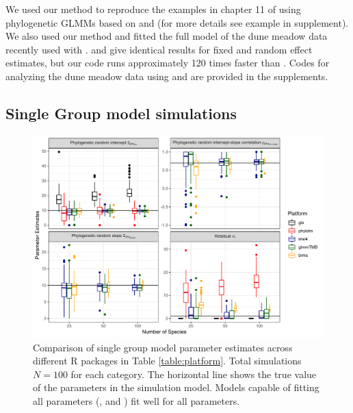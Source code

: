 \documentclass[12pt]{article}
\begin{document}
We used our method to reproduce the examples in chapter 11 of \cite{garamszegi2014modern} using phylogenetic GLMMs based on  and  (for more details see example in supplement).
We also used our method and fitted the full model of the dune meadow data recently used with  \citep{li2017canfun}. 
 and  give identical results for fixed and random effect estimates, but our code runs approximately 120 times faster than . 
Codes for analyzing the dune meadow data using  and  are provided in the supplements. 

\subsection*{Single Group model simulations}

\begin{center}
\begin{figure}[H]
  \includegraphics[scale=0.7,page=1]{./figure/ssplot.pdf}
  \caption{Comparison of single group model parameter estimates across different R packages in Table \ref{table:platform}. Total simulations $N=100$ for each category. The horizontal line shows the true value of the parameters in the simulation model. Models capable of fitting all parameters (,  and ) fit well for all parameters. 
}
\label{ssplot}
\end{figure}
\end{center}
\end{document}
